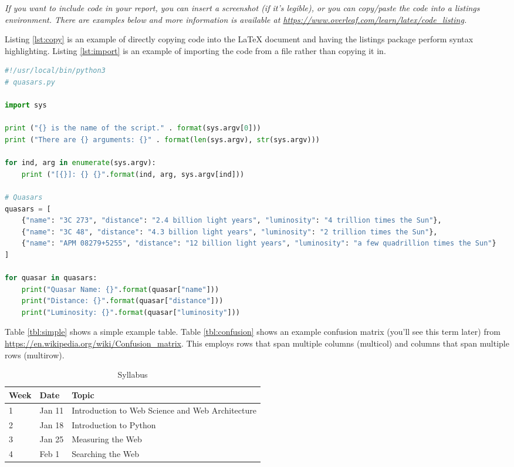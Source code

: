 \documentclass[12pt]{article}
\begin{document}
\emph{If you want to include code in your report, you can insert a screenshot (if it's legible), or you can copy/paste the code into a listings environment. There are examples below and more information is available at \url{https://www.overleaf.com/learn/latex/code_listing}.}

Listing \ref{lst:copy} is an example of directly copying code into the LaTeX document and having the listings package perform syntax highlighting. Listing \ref{lst:import} is an example of importing the code from a file rather than copying it in.

\begin{lstlisting}[language=Python, caption=A script for listing famous quasars, label=lst:quasars]
#!/usr/local/bin/python3
# quasars.py

import sys

print ("{} is the name of the script." . format(sys.argv[0]))
print ("There are {} arguments: {}" . format(len(sys.argv), str(sys.argv)))

for ind, arg in enumerate(sys.argv):
    print ("[{}]: {} {}".format(ind, arg, sys.argv[ind]))

# Quasars
quasars = [
    {"name": "3C 273", "distance": "2.4 billion light years", "luminosity": "4 trillion times the Sun"},
    {"name": "3C 48", "distance": "4.3 billion light years", "luminosity": "2 trillion times the Sun"},
    {"name": "APM 08279+5255", "distance": "12 billion light years", "luminosity": "a few quadrillion times the Sun"}
]

for quasar in quasars:
    print("Quasar Name: {}".format(quasar["name"]))
    print("Distance: {}".format(quasar["distance"]))
    print("Luminosity: {}".format(quasar["luminosity"]))

\end{lstlisting}



Table \ref{tbl:simple} shows a simple example table.  Table \ref{tbl:confusion} shows an example confusion matrix (you'll see this term later) from \url{https://en.wikipedia.org/wiki/Confusion_matrix}. This employs rows that span multiple columns (multicol) and columns that span multiple rows (multirow). 

\begin{table}[h]
\centering
\caption{Syllabus}
\label{tbl:Syllabus}
\begin{tabular}{|l|l|l|}
\hline
\textbf{Week} & \textbf{Date} & \textbf{Topic} \\ \hline \hline
1 & Jan 11 & Introduction to Web Science and Web Architecture \\ \hline
2 & Jan 18 & Introduction to Python \\ \hline
3 & Jan 25 & Measuring the Web \\ \hline
4 & Feb 1 &  Searching the Web \\ \hline
\end{tabular}
\end{table}
\end{document}

